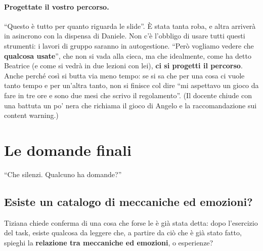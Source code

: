 \paragraph{Progettate il vostro percorso.} ``Questo è tutto per quanto riguarda le
slide''. È stata tanta roba, e altra arriverà in asincrono con la dispensa di Daniele.
Non c'è l'obbligo di usare tutti questi strumenti: i lavori di gruppo saranno in
autogestione. ``Però vogliamo vedere che \textbf{qualcosa usate}'', che non si vada
alla cieca, ma che idealmente, come ha detto Beatrice (e come si vedrà in due lezioni
con lei), \textbf{ci si progetti il percorso}. Anche perché così si butta via meno
tempo: se si sa che per una cosa ci vuole tanto tempo e per un'altra tanto, non si
finisce col dire ``mi aspettavo un gioco da fare in tre ore e sono due mesi che scrivo
il regolamento''. (Il docente chiude con una battuta un po' nera che richiama il gioco
di Angelo e la raccomandazione sui content warning.)

\section{Le domande finali}
\label{a6:sec:domande}

``Che silenzi. Qualcuno ha domande?''

\subsection{Esiste un catalogo di meccaniche ed emozioni?}
\label{a6:sec:catalogo}

Tiziana chiede conferma di una cosa che forse le è già stata detta: dopo l'esercizio
del task, esiste qualcosa da leggere che, a partire da ciò che è già stato fatto,
spieghi la \textbf{relazione tra meccaniche ed emozioni}, o esperienze?

